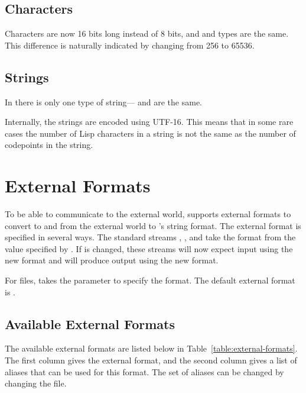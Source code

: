 \subsection{Characters}
\label{sec:i18n:characters}

Characters are now 16 bits long instead of 8 bits, and 
and  types are the same.  This difference is
naturally indicated by changing  from 256 to
65536.

\subsection{Strings}
\label{sec:i18n:strings}

In \cmucl{} there is only one type of string--- and
 are the same.  

Internally, the strings are encoded using UTF-16.  This means that in
some rare cases the number of Lisp characters in a string is not the
same as the number of codepoints in the string.


\section{External Formats}

To be able to communicate to the external world, \cmucl{} supports
external formats to convert to and from the external world to
\cmucl{}'s string format.  The external format is specified in several
ways.  The standard streams ,
, and  take the format
from the value specified by .  If
 is changed, these streams will now
expect input using the new format and will produce output using
the new format.

For files,  takes the 
parameter to specify the format.  The default external format is
. 

\subsection{Available External Formats}

The available external formats are listed below in
Table~\ref{table:external-formats}.  The first column gives the
external format, and the second column gives a list of aliases that
can be used for this format.  The set of aliases can be changed by
changing the  file.

